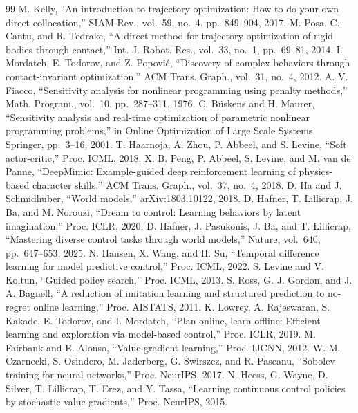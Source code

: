 \documentclass[MIRU,submit]{miru2025j}
\begin{document}
\begin{thebibliography}{99}
 M. Kelly, ``An introduction to trajectory optimization: How to do your own direct collocation,'' SIAM Rev., vol.~59, no.~4, pp.~849--904, 2017.
 M. Posa, C. Cantu, and R. Tedrake, ``A direct method for trajectory optimization of rigid bodies through contact,'' Int. J. Robot. Res., vol.~33, no.~1, pp.~69--81, 2014.
 I. Mordatch, E. Todorov, and Z. Popovi\'c, ``Discovery of complex behaviors through contact-invariant optimization,'' ACM Trans. Graph., vol.~31, no.~4, 2012.
 A. V. Fiacco, ``Sensitivity analysis for nonlinear programming using penalty methods,'' Math. Program., vol.~10, pp.~287--311, 1976.
 C. B\"uskens and H. Maurer, ``Sensitivity analysis and real-time optimization of parametric nonlinear programming problems,'' in Online Optimization of Large Scale Systems, Springer, pp.~3--16, 2001.
 T. Haarnoja, A. Zhou, P. Abbeel, and S. Levine, ``Soft actor-critic,'' Proc. ICML, 2018.
 X. B. Peng, P. Abbeel, S. Levine, and M. van de Panne, ``DeepMimic: Example-guided deep reinforcement learning of physics-based character skills,'' ACM Trans. Graph., vol.~37, no.~4, 2018.
 D. Ha and J. Schmidhuber, ``World models,'' arXiv:1803.10122, 2018.
 D. Hafner, T. Lillicrap, J. Ba, and M. Norouzi, ``Dream to control: Learning behaviors by latent imagination,'' Proc. ICLR, 2020.
 D. Hafner, J. Pasukonis, J. Ba, and T. Lillicrap, ``Mastering diverse control tasks through world models,'' Nature, vol.~640, pp.~647--653, 2025.
 N. Hansen, X. Wang, and H. Su, ``Temporal difference learning for model predictive control,'' Proc. ICML, 2022.
 S. Levine and V. Koltun, ``Guided policy search,'' Proc. ICML, 2013.
 S. Ross, G. J. Gordon, and J. A. Bagnell, ``A reduction of imitation learning and structured prediction to no-regret online learning,'' Proc. AISTATS, 2011.
 K. Lowrey, A. Rajeswaran, S. Kakade, E. Todorov, and I. Mordatch, ``Plan online, learn offline: Efficient learning and exploration via model-based control,'' Proc. ICLR, 2019.
 M. Fairbank and E. Alonso, ``Value-gradient learning,'' Proc. IJCNN, 2012.
 W. M. Czarnecki, S. Osindero, M. Jaderberg, G. \'Swirszcz, and R. Pascanu, ``Sobolev training for neural networks,'' Proc. NeurIPS, 2017.
 N. Heess, G. Wayne, D. Silver, T. Lillicrap, T. Erez, and Y. Tassa, ``Learning continuous control policies by stochastic value gradients,'' Proc. NeurIPS, 2015.

\end{thebibliography}
\end{document}
